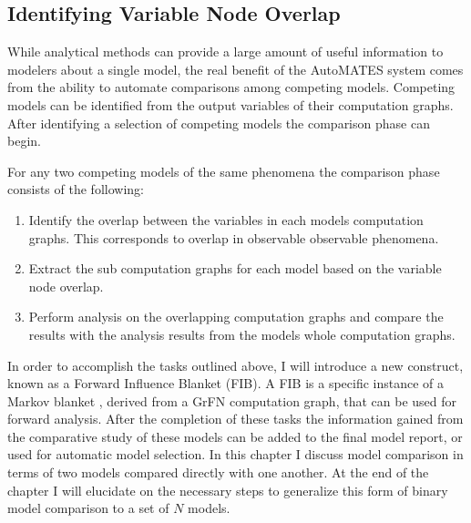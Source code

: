 \subsection{Identifying Variable Node Overlap\label{sec:overlap_identification}}
While analytical methods can provide a large amount of useful information to modelers about a single model, the real benefit of the AutoMATES system comes from the ability to automate comparisons among competing models. Competing models can be identified from the output variables of their computation graphs. After identifying a selection of competing models the comparison phase can begin.

For any two competing models of the same phenomena the comparison phase consists of the following:

\begin{enumerate}
  \item Identify the overlap between the variables in each models computation graphs. This corresponds to overlap in observable observable phenomena.
  \item Extract the sub computation graphs for each model based on the variable node overlap.
  \item Perform analysis on the overlapping computation graphs and compare the results with the analysis results from the models whole computation graphs.
\end{enumerate}

In order to accomplish the tasks outlined above, I will introduce a new construct, known as a Forward Influence Blanket (FIB). A FIB is a specific instance of a Markov blanket \citep{pearl2009causality}, derived from a GrFN computation graph, that can be used for forward analysis.  %
After the completion of these tasks the information gained from the comparative study of these models can be added to the final model report, or used for automatic model selection. In this chapter I discuss model comparison in terms of two models compared directly with one another. At the end of the chapter I will elucidate on the necessary steps to generalize this form of binary model comparison to a set of $N$ models.

